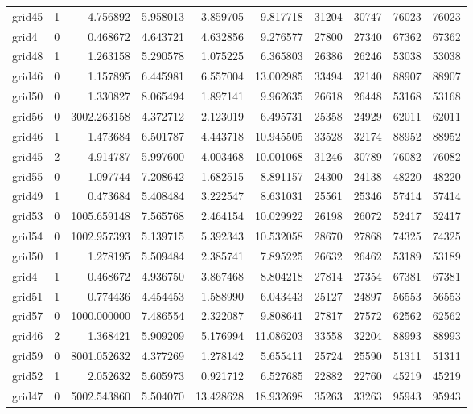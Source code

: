 \begin{longtable}{|l|r|r|r|r|r|r|r|r|r|}
grid45 & 1 & 4.756892 & 5.958013 & 3.859705 & 9.817718 & 31204 & 30747 & 76023 & 76023 \\
grid4 & 0 & 0.468672 & 4.643721 & 4.632856 & 9.276577 & 27800 & 27340 & 67362 & 67362 \\
grid48 & 1 & 1.263158 & 5.290578 & 1.075225 & 6.365803 & 26386 & 26246 & 53038 & 53038 \\
grid46 & 0 & 1.157895 & 6.445981 & 6.557004 & 13.002985 & 33494 & 32140 & 88907 & 88907 \\
grid50 & 0 & 1.330827 & 8.065494 & 1.897141 & 9.962635 & 26618 & 26448 & 53168 & 53168 \\
grid56 & 0 & 3002.263158 & 4.372712 & 2.123019 & 6.495731 & 25358 & 24929 & 62011 & 62011 \\
grid46 & 1 & 1.473684 & 6.501787 & 4.443718 & 10.945505 & 33528 & 32174 & 88952 & 88952 \\
grid45 & 2 & 4.914787 & 5.997600 & 4.003468 & 10.001068 & 31246 & 30789 & 76082 & 76082 \\
grid55 & 0 & 1.097744 & 7.208642 & 1.682515 & 8.891157 & 24300 & 24138 & 48220 & 48220 \\
grid49 & 1 & 0.473684 & 5.408484 & 3.222547 & 8.631031 & 25561 & 25346 & 57414 & 57414 \\
grid53 & 0 & 1005.659148 & 7.565768 & 2.464154 & 10.029922 & 26198 & 26072 & 52417 & 52417 \\
grid54 & 0 & 1002.957393 & 5.139715 & 5.392343 & 10.532058 & 28670 & 27868 & 74325 & 74325 \\
grid50 & 1 & 1.278195 & 5.509484 & 2.385741 & 7.895225 & 26632 & 26462 & 53189 & 53189 \\
grid4 & 1 & 0.468672 & 4.936750 & 3.867468 & 8.804218 & 27814 & 27354 & 67381 & 67381 \\
grid51 & 1 & 0.774436 & 4.454453 & 1.588990 & 6.043443 & 25127 & 24897 & 56553 & 56553 \\
grid57 & 0 & 1000.000000 & 7.486554 & 2.322087 & 9.808641 & 27817 & 27572 & 62562 & 62562 \\
grid46 & 2 & 1.368421 & 5.909209 & 5.176994 & 11.086203 & 33558 & 32204 & 88993 & 88993 \\
grid59 & 0 & 8001.052632 & 4.377269 & 1.278142 & 5.655411 & 25724 & 25590 & 51311 & 51311 \\
grid52 & 1 & 2.052632 & 5.605973 & 0.921712 & 6.527685 & 22882 & 22760 & 45219 & 45219 \\
grid47 & 0 & 5002.543860 & 5.504070 & 13.428628 & 18.932698 & 35263 & 33263 & 95943 & 95943 \\

\end{longtable}
